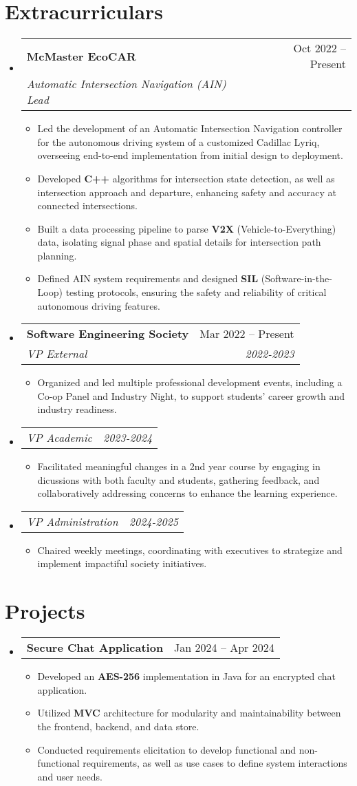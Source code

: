 \documentclass[letterpaper,11pt]{article}
\makeatletter
\newcommand{\resumeItem}[1]{
  \item\small{
    {#1 \vspace{-2pt}}
  }
}
\newcommand{\resumeSubheading}[4]{
  \vspace{-2pt}\item
    \begin{tabular*}{0.97\textwidth}[t]{l@{\extracolsep{\fill}}r}
      \textbf{#1} & #2 \\
      \textit{\small#3} & \textit{\small #4} \\
    \end{tabular*}\vspace{-7pt}
}
\newcommand{\resumeSubSubheading}[2]{
    \item
    \begin{tabular*}{0.97\textwidth}{l@{\extracolsep{\fill}}r}
      \textit{\small#1} & \textit{\small #2} \\
    \end{tabular*}\vspace{-7pt}
}
\newcommand{\resumeProjectHeading}[2]{
    \item
    \begin{tabular*}{0.97\textwidth}{l@{\extracolsep{\fill}}r}
      \small#1 & #2 \\
    \end{tabular*}\vspace{-7pt}
}
\newcommand{\resumeSubHeadingListStart}{\begin{itemize}[leftmargin=0.15in, label={}]}
\newcommand{\resumeSubHeadingListEnd}{\end{itemize}}
\newcommand{\resumeItemListStart}{\begin{itemize}}
\newcommand{\resumeItemListEnd}{\end{itemize}\vspace{-5pt}}
\makeatother
\begin{document}
\section{Extracurriculars}

\resumeSubHeadingListStart
    \resumeSubheading{McMaster EcoCAR}{Oct 2022 -- Present}{Automatic Intersection Navigation (AIN) Lead}{}
      \resumeItemListStart
        \resumeItem{Led the development of an Automatic Intersection Navigation controller for the autonomous driving system of a customized Cadillac Lyriq, overseeing end-to-end implementation from initial design to deployment.}
        \resumeItem{Developed \textbf{C++} algorithms for intersection state detection, as well as intersection approach and departure, enhancing safety and accuracy at connected intersections.}
        \resumeItem{Built a data processing pipeline to parse \textbf{V2X} (Vehicle-to-Everything) data, isolating signal phase and spatial details for intersection path planning.}  
        \resumeItem{Defined AIN system requirements and designed \textbf{SIL} (Software-in-the-Loop) testing protocols, ensuring the safety and reliability of critical autonomous driving features.}
      \resumeItemListEnd
  \resumeSubheading{Software Engineering Society}{Mar 2022 -- Present}{VP External}{2022-2023}
    \resumeItemListStart
      \resumeItem{Organized and led multiple professional development events, including a Co-op Panel and Industry Night, to support students' career growth and industry readiness.}
      \resumeItemListEnd
  \vspace{-2pt}
  \resumeSubSubheading{VP Academic}{2023-2024}
    \resumeItemListStart
      \resumeItem{Facilitated meaningful changes in a 2nd year course by engaging in dicussions with both faculty and students, gathering feedback, and collaboratively addressing concerns to enhance the learning experience.}
    \resumeItemListEnd
  \vspace{-2pt}
  \resumeSubSubheading{VP Administration}{2024-2025}
    \resumeItemListStart
      \resumeItem{Chaired weekly meetings, coordinating with executives to strategize and implement impactiful society initiatives.}
    \resumeItemListEnd
\resumeSubHeadingListEnd

\section{Projects}

\resumeSubHeadingListStart
  \resumeProjectHeading{\textbf{Secure Chat Application}}{Jan 2024 -- Apr 2024}
  \resumeItemListStart
    \resumeItem{Developed an \textbf{AES-256} implementation in Java for an encrypted chat application.}
    \resumeItem{Utilized \textbf{MVC} architecture for modularity and maintainability between the frontend, backend, and data store.}
    \resumeItem{Conducted requirements elicitation to develop functional and non-functional requirements, as well as use cases to define system interactions and user needs.}
  \resumeItemListEnd
\resumeSubHeadingListEnd
\end{document}

